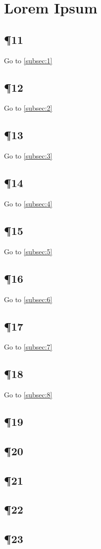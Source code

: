 \documentclass[twoside]{article}
\begin{document}
\section{Lorem Ipsum}
\subsection{\P 11}\label{subsec:11}\lipsum[11] Go to \ref{subsec:1}
\subsection{\P 12}\label{subsec:12}\lipsum[12] Go to \ref{subsec:2}
\subsection{\P 13}\label{subsec:13}\lipsum[13] Go to \ref{subsec:3}
\subsection{\P 14}\label{subsec:14}\lipsum[14] Go to \ref{subsec:4}
\syncpages
\subsection{\P 15}\label{subsec:15}\lipsum[15] Go to \ref{subsec:5}
\subsection{\P 16}\label{subsec:16}\lipsum[16] Go to \ref{subsec:6}
\subsection{\P 17}\label{subsec:17}\lipsum[17] Go to \ref{subsec:7}
\subsection{\P 18}\label{subsec:18}\lipsum[18] Go to \ref{subsec:8}
\subsection{\P 19}\label{subsec:19}\lipsum[19]
\subsection{\P 20}\label{subsec:20}\lipsum[20]
\subsection{\P 21}\label{subsec:21}\lipsum[21]
\subsection{\P 22}\label{subsec:22}\lipsum[22]
\subsection{\P 23}\label{subsec:23}\lipsum[23]
\syncpages
\end{document}
